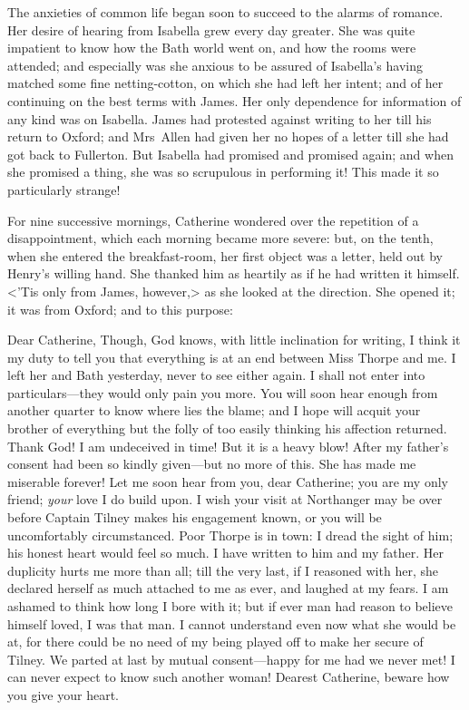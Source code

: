  The anxieties of common life began soon to succeed to the alarms of romance. Her desire of hearing from Isabella grew every day greater. She was quite impatient to know how the Bath world went on, and how the rooms were attended; and especially was she anxious to be assured of Isabella's having matched some fine netting-cotton, on which she had left her intent; and of her continuing on the best terms with James. Her only dependence for information of any kind was on Isabella. James had protested against writing to her till his return to Oxford; and Mrs~Allen had given her no hopes of a letter till she had got back to Fullerton. But Isabella had promised and promised again; and when she promised a thing, she was so scrupulous in performing it! This made it so particularly strange! 

 For nine successive mornings, Catherine wondered over the repetition of a disappointment, which each morning became more severe: but, on the tenth, when she entered the breakfast-room, her first object was a letter, held out by Henry's willing hand. She thanked him as heartily as if he had written it himself. <'Tis only from James, however,> as she looked at the direction. She opened it; it was from Oxford; and to this purpose:  
 
 \begin{mail}{}{Dear Catherine,}
 Though, God knows, with little inclination for writing, I think it my duty to tell you that everything is at an end between Miss Thorpe and me. I left her and Bath yesterday, never to see either again. I shall not enter into particulars—they would only pain you more. You will soon hear enough from another quarter to know where lies the blame; and I hope will acquit your brother of everything but the folly of too easily thinking his affection returned. Thank God! I am undeceived in time! But it is a heavy blow! After my father's consent had been so kindly given—but no more of this. She has made me miserable forever! Let me soon hear from you, dear Catherine; you are my only friend; \textit{your} love I do build upon. I wish your visit at Northanger may be over before Captain Tilney makes his engagement known, or you will be uncomfortably circumstanced. Poor Thorpe is in town: I dread the sight of him; his honest heart would feel so much. I have written to him and my father. Her duplicity hurts me more than all; till the very last, if I reasoned with her, she declared herself as much attached to me as ever, and laughed at my fears. I am ashamed to think how long I bore with it; but if ever man had reason to believe himself loved, I was that man. I cannot understand even now what she would be at, for there could be no need of my being played off to make her secure of Tilney. We parted at last by mutual consent—happy for me had we never met! I can never expect to know such another woman! Dearest Catherine, beware how you give your heart.  
 
 \closeletter[Believe me, \&c.]{}
\end{mail}



